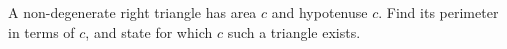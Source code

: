 A non-degenerate right triangle has area $c$ and hypotenuse $c$. Find its perimeter in terms of $c$, and state for which $c$ such a triangle exists.
